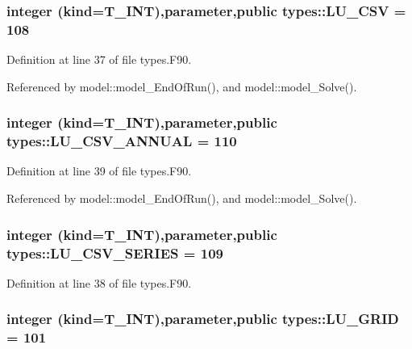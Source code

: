 \hypertarget{namespacetypes_a02191e0a119334a646624bf66c6032d0}{
\subsubsection[{LU\_\-CSV}]{\setlength{\rightskip}{0pt plus 5cm}integer (kind={\bf T\_\-INT}),parameter,public {\bf types::LU\_\-CSV} = 108}}
\label{namespacetypes_a02191e0a119334a646624bf66c6032d0}


Definition at line 37 of file types.F90.



Referenced by model::model\_\-EndOfRun(), and model::model\_\-Solve().

\hypertarget{namespacetypes_afc45706ea53210eeba59fbe5b2b3856c}{
\subsubsection[{LU\_\-CSV\_\-ANNUAL}]{\setlength{\rightskip}{0pt plus 5cm}integer (kind={\bf T\_\-INT}),parameter,public {\bf types::LU\_\-CSV\_\-ANNUAL} = 110}}
\label{namespacetypes_afc45706ea53210eeba59fbe5b2b3856c}


Definition at line 39 of file types.F90.



Referenced by model::model\_\-EndOfRun(), and model::model\_\-Solve().

\hypertarget{namespacetypes_a3b64a784a138287166d3c1717c8fc641}{
\subsubsection[{LU\_\-CSV\_\-SERIES}]{\setlength{\rightskip}{0pt plus 5cm}integer (kind={\bf T\_\-INT}),parameter,public {\bf types::LU\_\-CSV\_\-SERIES} = 109}}
\label{namespacetypes_a3b64a784a138287166d3c1717c8fc641}


Definition at line 38 of file types.F90.

\hypertarget{namespacetypes_a47b83df3491e1221a3ac68ddffeaa66d}{
\subsubsection[{LU\_\-GRID}]{\setlength{\rightskip}{0pt plus 5cm}integer (kind={\bf T\_\-INT}),parameter,public {\bf types::LU\_\-GRID} = 101}}
\label{namespacetypes_a47b83df3491e1221a3ac68ddffeaa66d}


